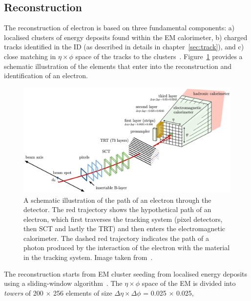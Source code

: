 \subsection{Reconstruction}
The reconstruction of electron is based on three fundamental components: 
a) localised clusters of energy deposits found within the EM calorimeter, 
b) charged tracks identified in the ID (as described in details in chapter~\ref{sec:track}),
and c) close matching in $\eta \times \phi$ space of the tracks to the clusters~\cite{PERF-2017-01}.
Figure~\ref{fig:electron_recon} provides a schematic illustration of the elements that enter into
the reconstruction and identification of an electron. 
\begin{figure}[bht]
    \begin{centering}	
    \includegraphics[width=1.0\textwidth]{Reconstruction/plots/electron.jpg}
    \caption{A schematic illustration of the path of an electron through the detector. 
    The red trajectory shows the 
    hypothetical path of an electron, which first traverses the tracking system (pixel detectors, then SCT
    and lastly the TRT) and then enters the electromagnetic calorimeter. 
    The dashed red trajectory indicates the path of a
    photon produced by the interaction of the electron with the material in the tracking system. 
    Image taken from~\cite{PERF-2017-01}.
        }
    \label{fig:electron_recon}
    \end{centering}
\end{figure}
The reconstruction starts from EM cluster seeding from localised energy deposits 
using a sliding-window algorithm~\cite{sliding-window}.
The $\eta \times \phi$ space of the EM is divided into \textit{towers} of 200 $\times$ 256
elements of size $\Delta\eta \times \Delta\phi$ = 0.025 $\times$ 0.025, 
